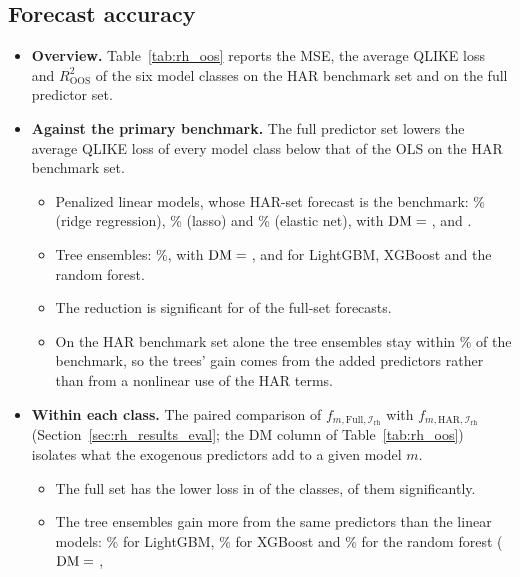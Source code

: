 \subsection{Forecast accuracy}
\label{sec:rh_results_oos}
\label{sec:rh_results_predictors}
\begin{itemize}
\item \textbf{Overview.} Table~\ref{tab:rh_oos} reports the MSE, the average QLIKE loss and $R^2_{\mathrm{OOS}}$ of
  the six model classes on the HAR benchmark set and on the full predictor set.
\item \textbf{Against the primary benchmark.} The full predictor set lowers the average QLIKE loss of every model
  class below that of the OLS on the HAR benchmark set.
  \begin{itemize}
  \item Penalized linear models, whose HAR-set forecast is the benchmark: \rhorVsOlsPctRidgeFull\% (ridge regression),
    \rhorVsOlsPctLassoFull\% (lasso) and \rhorVsOlsPctEnetFull\% (elastic net), with $\mathrm{DM}={}$\rhorDmRidgeB,
    \rhorDmLassoB{} and \rhorDmEnetB.
  \item Tree ensembles: \rhorVsOlsRedTreeRng{}\%, with $\mathrm{DM}={}$\rhorVsOlsDmLgbmFull,
    \rhorVsOlsDmXgbFull{} and \rhorVsOlsDmRfFull{} for LightGBM, XGBoost and the random forest.
  \item The reduction is significant for \rhorVsOlsLowerSig{} of the \rhorAfPairs{} full-set forecasts.
  \item On the HAR benchmark set alone the tree ensembles stay within \rhorVsOlsPctTreeHarMaxAbs{}\% of the
    benchmark, so the trees' gain comes from the added predictors rather than from a nonlinear use of the HAR terms.
  \end{itemize}
\item \textbf{Within each class.} The paired comparison of $f_{m,\mathrm{Full},\mathcal I_{\mathrm{rh}}}$ with
  $f_{m,\mathrm{HAR},\mathcal I_{\mathrm{rh}}}$ (Section~\ref{sec:rh_results_eval}; the DM column of
  Table~\ref{tab:rh_oos}) isolates what the exogenous predictors add to a given model $m$.
  \begin{itemize}
  \item The full set has the lower loss in \rhorAfLower{} of the \rhorAfPairs{} classes, \rhorAfLowerSig{} of them
    significantly.
  \item The tree ensembles gain more from the same predictors than the linear models: \rhabLgbmFullAllPct\% for
    LightGBM, \rhabXgbFullAllPct\% for XGBoost and \rhabRfFullAllPct\% for the random forest ($\mathrm{DM}={}$\rhorDmLgbmB,

\end{itemize}
\end{itemize}
